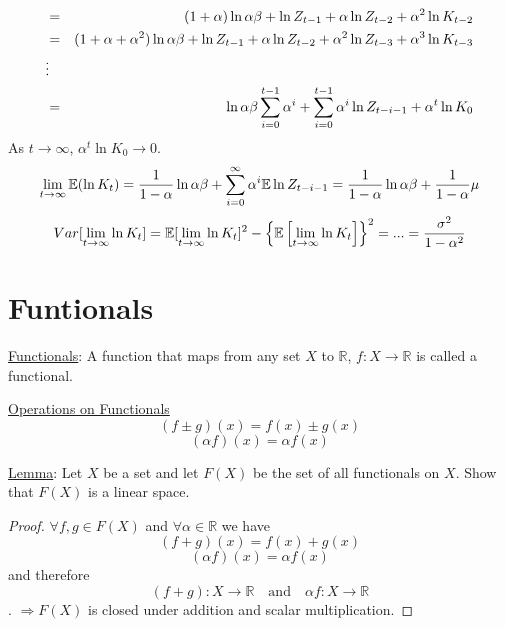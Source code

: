 \documentclass[twoside]{article}
\newcommand\imp{$\Longrightarrow$}
\newcommand\lcb{\left \{}
\newcommand\rcb{\right \}}
\begin{document}
\begin{example}
\begin{eqnarray}
        &=& (1+\alpha) \ln \alpha \beta + \ln Z_{t-1} + \alpha \ln Z_{t-2} + \alpha^{2} \ln K_{t-2}\\
        &=& (1+\alpha+ \alpha^{2}) \ln \alpha \beta + \ln Z_{t-1} + \alpha \ln Z_{t-2} + \alpha^{2} \ln Z_{t-3} + \alpha^{3} \ln K_{t-3}\\
        &\vdots& \notag\\
        &=& \ln \alpha \beta \sum_{i=0}^{t-1} \alpha^{i} + \sum_{i=0}^{t-1} \alpha^{i} \ln Z_{t-i-1} + \alpha^{t} \ln K_{0}
    \end{eqnarray}
    As $t \to \infty$, $\alpha^{t}\ln K_{0} \to 0$.
    \begin{equation}
        \lim_{t \to \infty} \mathbb{E} ( \ln K_{t}) = \frac{1}{1-  \alpha} \ln \alpha \beta + \sum_{i=0}^{\infty} \alpha^{i} \mathbb{E} \ln Z_{t-i-1} = \frac{1}{1-  \alpha} \ln \alpha \beta + \frac{1}{1 - \alpha} \mu
    \end{equation}
    \begin{equation}
        Var[\lim_{t \to \infty} \ln K_{t}] = \E [\lim_{t \to \infty} \ln K_{t}]^{2} - \lcb \E \left[ \lim_{t \to \infty} \ln K_{t} \right]  \rcb^{2}= ... = \frac{\sigma^{2}}{1 - \alpha^{2}}
    \end{equation}
\end{example}

\section{Funtionals}
\underline{Functionals}:
A function that maps from any set $X$ to $\mathbb{R}$, $f: X \to \mathbb{R}$ is called a functional.

\underline{Operations on Functionals}
\begin{equation}
    (f \pm g)(x) = f(x) \pm g(x)
\end{equation}
\begin{equation}
    (\alpha f )(x) = \alpha f(x)
\end{equation}

\underline{Lemma}: Let $X$ be a set and let $F(X)$ be the set of all functionals on $X$. Show that $F(X)$ is a linear space.

\begin{proof}
    $\forall f, g \in F(X)$ and $\forall \alpha \in \mathbb{R}$ we have
    $$
        (f + g)(x) = f(x) + g(x)
    $$
    $$
        (\alpha f)(x) = \alpha f(x)
    $$
    and therefore
    $$(f+g): X \to \mathbb{R} \quad \text{and} \quad \alpha f: X \to \mathbb{R}$$.
    \imp $F(X)$ is closed under addition and scalar multiplication.
\end{proof}
\end{document}
